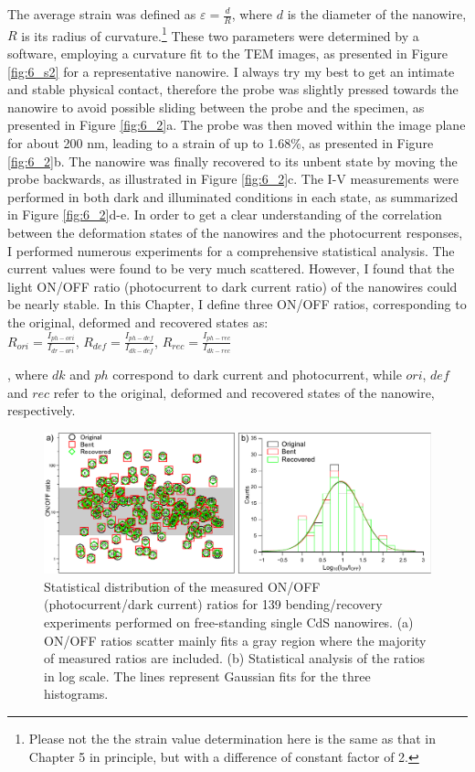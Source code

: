 The average strain was defined as $\varepsilon = \frac{d}{R}$, where $d$ is the diameter of the nanowire, $R$ is its radius of  curvature.\footnote{Please not the the strain value determination here is the same as that in Chapter 5 in principle, but with a difference of constant factor of 2.} 
These two parameters were determined by a software, employing a curvature fit to the TEM images, as presented in Figure \ref{fig:6_s2} for a representative nanowire. 
I always try my best to get an intimate and stable physical contact, therefore the probe was slightly pressed towards the nanowire to avoid possible sliding between the probe and the specimen, as presented in Figure \ref{fig:6_2}a. 
The probe was then moved within the image plane for about 200 nm, leading to a strain of up to 1.68\%, as presented in Figure \ref{fig:6_2}b. 
The nanowire was finally recovered to its unbent state by moving the probe backwards, as illustrated in Figure \ref{fig:6_2}c. 
The I-V measurements were performed in both dark and illuminated conditions in each state, as summarized in Figure \ref{fig:6_2}d-e. 
In order to get a clear understanding of the correlation between the deformation states of the nanowires and the photocurrent responses, I performed numerous experiments for a comprehensive statistical analysis. 
The current values were found to be very much scattered. 
However, I found that the light ON/OFF ratio (photocurrent to dark current ratio) of the nanowires could be nearly stable. 
In this Chapter, I define three ON/OFF ratios, corresponding to the original, deformed and recovered states as:\\
{\center
$R_{ori} = \frac{I_{ph-ori}}{I_{dr-ori}}$, $R_{def} = \frac{I_{ph-def}}{I_{dk-def}}$, $R_{rec} = \frac{I_{ph-rec}}{I_{dk-rec}}$\\}

, where $dk$ and $ph$ correspond to dark current and photocurrent, while $ori$, $def$ and $rec$ refer to the original, deformed and recovered states of the nanowire, respectively.\\

\begin{figure}  
\includegraphics[width=\textwidth]{figures/figure6_3}
\caption[Statistical distribution of ON/OFF ratios]
{Statistical distribution of the measured ON/OFF (photocurrent/dark current) ratios for 139 bending/recovery experiments performed on free-standing single CdS nanowires. (a) ON/OFF ratios scatter mainly fits a gray region where the majority of measured ratios are included. (b) Statistical analysis of the ratios in log  scale. The lines represent Gaussian fits for the three histograms.
\label{fig:6_3}}
\end{figure}

